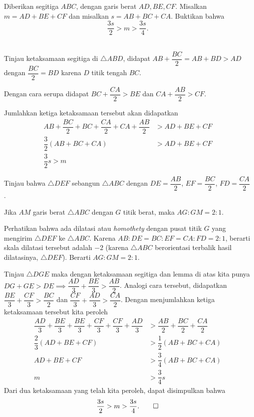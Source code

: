 \documentclass[12pt]{scrartcl}
\begin{document}
	\begin{soalbaru}
		Diberikan segitiga $ABC$, dengan garis berat $AD, BE, CF$. Misalkan $m=AD+BE+CF$ dan misalkan $s=AB+BC+CA$. Buktikan bahwa $$\dfrac{3s}{2} > m > \dfrac{3s}{4}.$$\\[-20pt]
		
		\begin{solusi}
		Tinjau ketaksamaan segitiga di $\triangle ABD$, didapat $AB+\dfrac{BC}{2} = AB+BD > AD$ dengan $\dfrac{BC}{2}=BD$ karena $D$ titik tengah $BC$.
		
		Dengan cara serupa didapat $BC+\dfrac{CA}{2} > BE$ dan $CA + \dfrac{AB}{2}>CF$.
		
		Jumlahkan ketiga ketaksamaan tersebut akan didapatkan 
		\begin{align*}
		AB+\dfrac{BC}{2}+BC+\dfrac{CA}{2}+CA+\dfrac{AB}{2} &> AD+BE+CF\\
		\dfrac{3}{2}\left(AB+BC+CA\right)&> AD+BE+CF\\
		\dfrac{3}{2}s > m
		\end{align*}
		
		Tinjau bahwa $\triangle DEF$ sebangun $\triangle ABC$ dengan $DE = \dfrac{AB}{2}$, $EF=\dfrac{BC}{2}$, $FD=\dfrac{CA}{2}$. 
		
			\begin{lemmarev}
					Jika $AM$ garis berat $\triangle ABC$ dengan $G$ titik berat, maka $AG:GM = 2:1$.
					\begin{buktilemma}
					Perhatikan bahwa ada dilatasi atau \textit{ homothety } dengan pusat titik $G$ yang mengirim $\triangle DEF$ ke $\triangle ABC$. Karena $AB:DE=BC:EF=CA:FD=2:1$, berarti skala dilatasi tersebut adalah $-2$ (karena $\triangle ABC$ berorientasi terbalik hasil dilatasinya, $\triangle DEF$). Berarti $AG:GM=2:1$.
					\end{buktilemma}
				\end{lemmarev}
		
		Tinjau $\triangle DGE$ maka dengan ketaksamaan segitiga dan lemma di atas kita punya $DG + GE > DE \implies \dfrac{AD}{3}+\dfrac{BE}{3}>\dfrac{AB}{2}$. Analogi cara tersebut, didapatkan $\dfrac{BE}{3}+\dfrac{CF}{3}>\dfrac{BC}{2}$ dan $\dfrac{CF}{3}+\dfrac{AD}{3}>\dfrac{CA}{2}$. Dengan menjumlahkan ketiga ketaksamaan tersebut kita peroleh
		\begin{align*}
		\dfrac{AD}{3}+\dfrac{BE}{3}+\dfrac{BE}{3}+\dfrac{CF}{3}+\dfrac{CF}{3}+\dfrac{AD}{3} &> \dfrac{AB}{2}+\dfrac{BC}{2}+\dfrac{CA}{2}\\
		\dfrac{2}{3}\left(AD+BE+CF\right) &> \dfrac{1}{2}\left(AB+BC+CA\right)\\
		AD+BE+CF&> \dfrac{3}{4}\left(AB+BC+CA\right)\\
		m &> \dfrac{3}{4}s
		\end{align*}
		Dari dua ketaksamaan yang telah kita peroleh, dapat disimpulkan bahwa $$\dfrac{3s}{2} > m > \dfrac{3s}{4}.\qed$$ 
		\end{solusi}
	\end{soalbaru}
	
\end{document}
